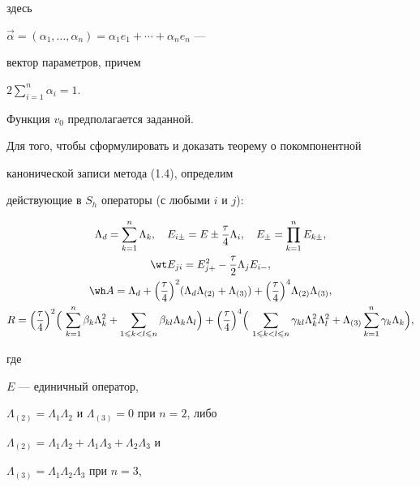 здесь 


$\Vec\alpha=(\alpha_1,\dotsc,\alpha_n)=\alpha_1e_1+\dotsb+\alpha_ne_n$ --- 


вектор параметров, причем 


$2\sum\limits_{i=1}^n\alpha_i=1$.


Функция $v_{0}$ предполагается заданной.





Для того, чтобы сформулировать и доказать теорему о покомпонентной


канонической записи метода (1.4), определим


действующие в $S_h$ операторы (с любыми $i$ и $j$):


\begin{gather*}


\Lambda_d=\sum_{k=1}^n\Lambda_k,\quad


E_{i\pm}=E\pm \frac{\tau}{4}\Lambda_i,\quad


E_\pm=\prod_{k=1}^nE_{k\pm},\\


\wt E_{ji}=E_{j+}^2-\frac{\tau}{2}\Lambda_j E_{i-},\\


\wh A =\Lambda_d+\Big(\frac{\tau}{4}\Big)^2(\Lambda_d\Lambda_{(2)}+


\Lambda_{(3)})+\Big(\dfrac{\tau}{4}\Big)^4\Lambda_{(2)}\Lambda_{(3)},\\


R=\Big(\dfrac{\tau}{4}\Bigr)^2\Big(\,\sum_{k=1}^n\beta_k\Lambda_k^2+


\sum_{1\leqslant k<l\leqslant n}\beta_{kl}


\Lambda_k\Lambda_l\Big)+


\Big(\dfrac{\tau}{4}\Big)^4\Big(\,\sum_{1\leqslant k<l\leqslant n}


\gamma_{kl}\Lambda_k^2\Lambda_l^2+


\Lambda_{(3)}\sum_{k=1}^n\gamma_k\Lambda_k\Big),


\end{gather*}


где 


$E$ --- единичный оператор,


$\Lambda_{(2)}=\Lambda_1\Lambda_2$ и $\Lambda_{(3)}=0$ при $n=2$, либо


$\Lambda_{(2)}=\Lambda_1\Lambda_2+\Lambda_1\Lambda_3+\Lambda_2\Lambda_3$ и


$\Lambda_{(3)}=\Lambda_1\Lambda_2\Lambda_3$ при $n=3$,


